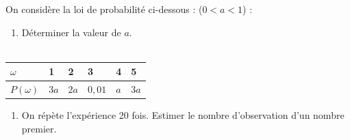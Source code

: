 \documentclass[main.tex]{subfiles}
\begin{document}
\begin{exercise}	On considère la loi de probabilité ci-dessous :  ($0<a<1$) : \hfill \\ 
	\noindent\parbox{0.56\linewidth}{  
\begin{spacing}{1.8} 
\begin{enumerate}[label=\arabic*), leftmargin=*]
\item Déterminer la valeur de $a$.\\
\null\dotfill\null  \\
\null\dotfill\null  
\end{enumerate}
\end{spacing}
	}	
	\parbox{0.46\linewidth}{ \centering
		\renewcommand{\arraystretch}{1.5} 
		\begin{tabular}{|C{1.0cm}|C{0.8cm}|C{0.8cm}|C{0.8cm}|C{0.8cm}|C{0.8cm}|}
			\hline
			$\omega$ &	1	& 2	& 3 &	4 &	5\\ \hline
			$P(\omega)$ &	$3a$ &	$2a$ &	$0,01$ &	$a$ &	$3a$ \\ \hline
		\end{tabular}
	}  
\begin{spacing}{1.8} 
\begin{enumerate}[label=\arabic*), leftmargin=*,start=2]  
	\item On répète l'expérience 20 fois. Estimer le nombre d'observation d'un nombre premier. \\
	\null\dotfill\null 
\end{enumerate}  
\end{spacing}
\end{exercise}  
\end{document}
